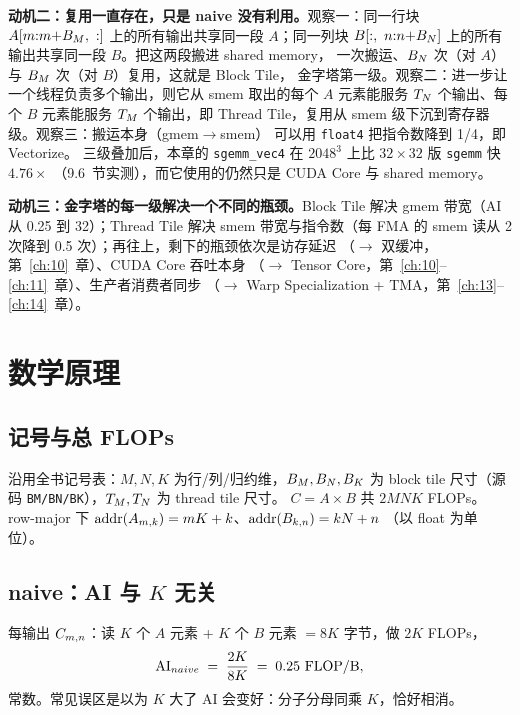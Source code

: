 \textbf{动机二：复用一直存在，只是 naive 没有利用。}观察一：同一行块
$A[m{:}m{+}B\sb{M},\ :]$ 上的所有输出共享同一段 $A$；同一列块
$B[:,\ n{:}n{+}B\sb{N}]$ 上的所有输出共享同一段 $B$。把这两段搬进 shared memory，
一次搬运、$B\sb{N}$ 次（对 $A$）与 $B\sb{M}$ 次（对 $B$）复用，这就是 Block Tile，
金字塔第一级。观察二：进一步让一个线程负责多个输出，则它从 smem 取出的每个
$A$ 元素能服务 $T\sb{N}$ 个输出、每个 $B$ 元素能服务 $T\sb{M}$ 个输出，即
Thread Tile，复用从 smem 级下沉到寄存器级。观察三：搬运本身（gmem$\to$smem）
可以用 \texttt{float4} 把指令数降到 1/4，即 Vectorize。
三级叠加后，本章的 \texttt{sgemm\_vec4} 在 $2048^3$ 上比 $32{\times}32$ 版
\texttt{sgemm} 快 $4.76\times$
（9.6~节实测），而它使用的仍然只是 CUDA Core 与 shared memory。

\textbf{动机三：金字塔的每一级解决一个不同的瓶颈。}\allowbreak{}Block Tile 解决
gmem 带宽（AI 从 0.25 到 32）；Thread Tile 解决 smem 带宽与指令数（每 FMA 的
smem 读从 2 次降到 0.5 次）；再往上，剩下的瓶颈依次是访存延迟
（$\to$ 双缓冲，第~\ref{ch:10}~章）、CUDA Core 吞吐本身
（$\to$ Tensor Core，第~\ref{ch:10}--\ref{ch:11}~章）、生产者消费者同步
（$\to$ Warp Specialization + TMA，第~\ref{ch:13}--\ref{ch:14}~章）。

\section{数学原理}

\subsection{记号与总 FLOPs}

沿用全书记号表：$M, N, K$ 为行/列/归约维，$B\sb{M}, B\sb{N}, B\sb{K}$ 为 block tile
尺寸（源码 \texttt{BM/BN/BK}），$T\sb{M}, T\sb{N}$ 为 thread tile 尺寸。
$C = A \times B$ 共 $2MNK$ FLOPs。row-major 下
$\mathrm{addr}(A\sb{m,k}) = mK + k$、$\mathrm{addr}(B\sb{k,n}) = kN + n$
（以 float 为单位）。

\subsection{naive：AI 与 $K$ 无关}

每输出 $C\sb{m,n}$：读 $K$ 个 $A$ 元素 + $K$ 个 $B$ 元素 $= 8K$ 字节，做 $2K$ FLOPs，
\begin{equation}
  \mathrm{AI}\sb{naive} \;=\; \frac{2K}{8K} \;=\; 0.25 \ \text{FLOP/B},
  \label{eq:9-ai-naive}
\end{equation}
常数。常见误区是以为 $K$ 大了 AI 会变好：分子分母同乘 $K$，恰好相消。

